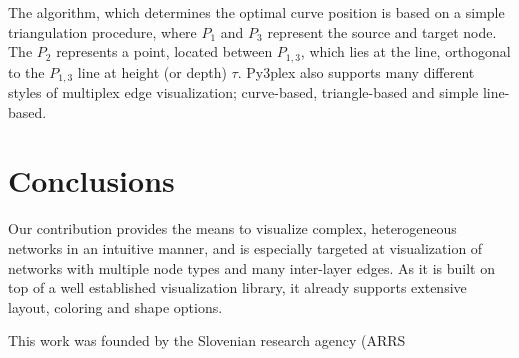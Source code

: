 The algorithm, which determines the optimal curve position is based on a simple triangulation procedure, where $P_{1}$ and $P_{3}$ represent the source and target node. The $P_{2}$ represents a point, located between $P_{1,3}$, which lies at the line, orthogonal to the $P_{1,3}$ line at height (or depth) $\tau$. Py3plex also supports many different styles of multiplex edge visualization; curve-based, triangle-based and simple line-based. 

\section{Conclusions}
Our contribution provides the means to visualize complex, heterogeneous networks in an intuitive manner, and is especially targeted at visualization of networks with multiple node types and many inter-layer edges. As it is built on top of a well established visualization library, it already supports extensive layout, coloring and shape options.

\begin{acknowledgements}
This work was founded by the Slovenian research agency (ARRS
\end{acknowledgements}


  



